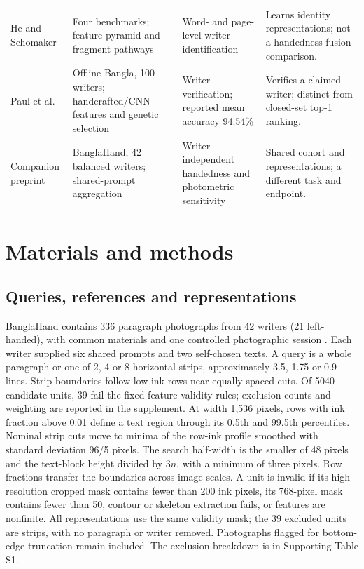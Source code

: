 \begin{table}[!t]
\begin{tabularx}{\textwidth}{@{}p{}p{}p{}X@{}}
He and Schomaker \cite{he2020fragnet} & Four benchmarks; feature-pyramid and fragment pathways & Word- and page-level writer identification & Learns identity representations; not a handedness-fusion comparison.\\
Paul et al.\ \cite{paul2024bangla} & Offline Bangla, 100 writers; handcrafted/CNN features and genetic selection & Writer verification; reported mean accuracy 94.54\% & Verifies a claimed writer; distinct from closed-set top-1 ranking.\\
Companion preprint \cite{prappo2026handedness} & BanglaHand, 42 balanced writers; shared-prompt aggregation & Writer-independent handedness and photometric sensitivity & Shared cohort and representations; a different task and endpoint.\\\bottomrule
\end{tabularx}
\end{table}

\section{Materials and methods}
\label{sec:protocol}
\subsection{Queries, references and representations}
BanglaHand contains 336 paragraph photographs from 42 writers (21 left-handed), with common materials and one controlled photographic session \cite{banglahand2026data}. Each writer supplied six shared prompts and two self-chosen texts. A query is a whole paragraph or one of 2, 4 or 8 horizontal strips, approximately 3.5, 1.75 or 0.9 lines. Strip boundaries follow low-ink rows near equally spaced cuts. Of 5040 candidate units, 39 fail the fixed feature-validity rules; exclusion counts and weighting are reported in the supplement. At width 1,536 pixels, rows with ink fraction above 0.01 define a text region through its 0.5th and 99.5th percentiles. Nominal strip cuts move to minima of the row-ink profile smoothed with standard deviation 96/5 pixels. The search half-width is the smaller of 48 pixels and the text-block height divided by $3n$, with a minimum of three pixels. Row fractions transfer the boundaries across image scales. A unit is invalid if its high-resolution cropped mask contains fewer than 200 ink pixels, its 768-pixel mask contains fewer than 50, contour or skeleton extraction fails, or features are nonfinite. All representations use the same validity mask; the 39 excluded units are strips, with no paragraph or writer removed. Photographs flagged for bottom-edge truncation remain included. The exclusion breakdown is in Supporting Table S1.


